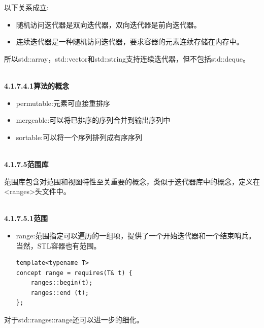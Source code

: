以下关系成立:

\begin{itemize}
\item
随机访问迭代器是双向迭代器，双向迭代器是前向迭代器。

\item
连续迭代器是一种随机访问迭代器，要求容器的元素连续存储在内存中。
\end{itemize}

所以std::array，std::vector和std::string支持连续迭代器，但不包括std::deque。

\hspace*{\fill} \\ %
\noindent
\textbf{4.1.7.4.1\hspace{0.2cm}算法的概念}

\begin{itemize}
\item
permutable:元素可直接重排序

\item
mergeable:可以将已排序的序列合并到输出序列中

\item
sortable:可以将一个序列排列成有序序列
\end{itemize}

\hspace*{\fill} \\ %
\noindent
\textbf{4.1.7.5\hspace{0.2cm}范围库}

范围库包含对范围和视图特性至关重要的概念，类似于迭代器库中的概念，定义在<ranges>头文件中。

\hspace*{\fill} \\ %
\noindent
\textbf{4.1.7.5.1\hspace{0.2cm}范围}

\begin{itemize}
\item
range:范围指定可以遍历的一组项，提供了一个开始迭代器和一个结束哨兵。当然，STL容器也有范围。
\begin{lstlisting}[style=styleCXX]
template<typename T>
concept range = requires(T& t) {
	ranges::begin(t);
	ranges::end (t);
};
\end{lstlisting}
\end{itemize}

对于std::ranges::range还可以进一步的细化。

